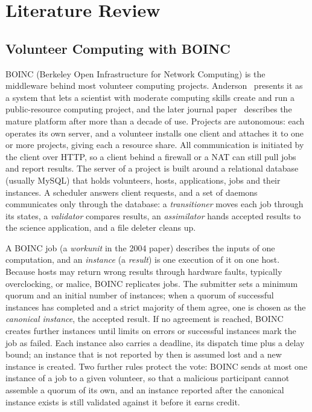 \section{Literature Review}
\label{sec:literature}

\subsection{Volunteer Computing with BOINC}
BOINC (Berkeley Open Infrastructure for Network Computing) is the middleware behind most volunteer computing projects. Anderson~\cite{anderson2004boinc} presents it as a system that lets a scientist with moderate computing skills create and run a public-resource computing project, and the later journal paper~\cite{anderson2020boinc} describes the mature platform after more than a decade of use. Projects are autonomous: each operates its own server, and a volunteer installs one client and attaches it to one or more projects, giving each a resource share. All communication is initiated by the client over HTTP, so a client behind a firewall or a NAT can still pull jobs and report results. The server of a project is built around a relational database (usually MySQL) that holds volunteers, hosts, applications, jobs and their instances. A scheduler answers client requests, and a set of daemons communicates only through the database: a \emph{transitioner} moves each job through its states, a \emph{validator} compares results, an \emph{assimilator} hands accepted results to the science application, and a file deleter cleans up.

A BOINC job (a \emph{workunit} in the 2004 paper) describes the inputs of one computation, and an \emph{instance} (a \emph{result}) is one execution of it on one host. Because hosts may return wrong results through hardware faults, typically overclocking, or malice, BOINC replicates jobs. The submitter sets a minimum quorum and an initial number of instances; when a quorum of successful instances has completed and a strict majority of them agree, one is chosen as the \emph{canonical instance}, the accepted result. If no agreement is reached, BOINC creates further instances until limits on errors or successful instances mark the job as failed. Each instance also carries a deadline, its dispatch time plus a delay bound; an instance that is not reported by then is assumed lost and a new instance is created. Two further rules protect the vote: BOINC sends at most one instance of a job to a given volunteer, so that a malicious participant cannot assemble a quorum of its own, and an instance reported after the canonical instance exists is still validated against it before it earns credit.


